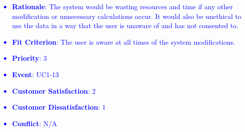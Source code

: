 \documentclass[12pt, titlepage]{article}
\newcounter{reqnum} %
\newcounter{freqnum} %
\begin{document}
\begin{itemize}
\textcolor{blue}{
\item[NFR\refstepcounter{freqnum}\thefreqnum
\label{NFR}:] 
\begin{itemize}
    \item \textbf{Rationale}: The system would be wasting resources and time if any other modification or unnecessary calculations occur. It would also be unethical to use the data in a way that the user is unaware of and has not consented to. 
    \item \textbf{Fit Criterion}: The user is aware at all times of the system modifications. 
    \item \textbf{Priority}: 3
    \item \textbf{Event}: UC1-13%
    \item \textbf{Customer Satisfaction}: 2
    \item \textbf{Customer Dissatisfaction}: 1
    \item \textbf{Conflict}: N/A
\end{itemize}
}


\end{itemize}
\end{document}
